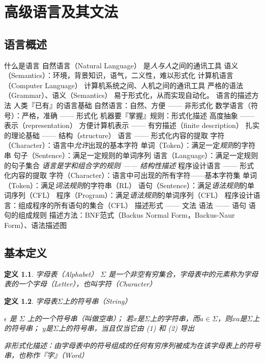 \documentclass[oneside]{ctexbook}
\newtheorem{definition}{定义}[section]
\begin{document}
\chapter{高级语言及其文法}
\section{语言概述}
\begin{outline}
    \1 什么是语言
        \2 自然语言（Natural Language）
            \3 是\emph{人与人}之间的通讯工具
            \3 语义（Semantics）：环境，背景知识，语气，二义性，难以形式化
        \2 计算机语言（Computer Language）
            \3 计算机系统之间、人机之间的通讯工具
            \3 严格的语法（Grammar）、语义（Semantics）
                \4 易于形式化，从而实现自动化。
    \1 语言的描述方法
        \2 人类『已有』的语言基础
            \3 自然语言：自然、方便 —— 非形式化
            \3 数学语言（符号）：严格，准确 —— 形式化
        \2 机器要『掌握』规则：形式化描述
            \3 高度抽象 —— 表示（representation）
            \3 方便计算机表示 —— 有穷描述（finite description）
            \3 扎实的理论基础 —— 结构（structure）
    \1 语言 —— 形式化内容的提取
        \2 字符（Character）：语言中\emph{允许}出现的基本字符
        \2 单词（Token）：满足一定\emph{规则}的字符串
        \2 句子（Sentence）：满足一定规则的单词序列
        \2 语言（Language）：满足一定规则的句子集合
    \1 \emph{语言是字和组合字的规则 —— 结构性描述}
    \1 程序设计语言 —— 形式化内容的提取
        \2 字符（Character）：语言中可出现的所有字符——基本字符集
        \2 单词（Token）：满足\emph{词法规则}的字符串（RL）
        \2 语句（Sentence）：满足\emph{语法规则}的单词序列（CFL）
        \2 程序（Program）：满足\emph{语法规则}的单词序列（CFL）
        \2 程序设计语言：组成程序的所有语句的集合（CFL）
    \1 描述形式 —— 文法
        \2 语法 —— 语句
            \3 语句的组成规则
            \3 描述方法：BNF范式（Backus Normal Form，Backus-Naur Form）、语法描述图
\end{outline}
\section{基本定义}
\begin{definition}
    字母表（Alphabet） $\Sigma$ 是一个非空有穷集合，字母表中的元素称为字母表的一个字母（Letter），也叫字符（Character）
\end{definition}
\begin{definition}
    字母表$\Sigma$上的符号串（String）
    \begin{outline}[enumerate]
        \1 $\epsilon$ 是 $\Sigma$ 上的一个符号串（叫做空串）；
        \1 若$x$是$\Sigma$上的字符串，而$a \in \Sigma$，则$xa$是$\Sigma$上的符号串；
        \1 $y$是$\Sigma$上的符号串，当且仅当它由 (1) 和 (2) 导出
    \end{outline}

    非形式化描述：由字母表中的符号组成的任何有穷序列被成为在该字母表上的符号串，也称作『字』（Word）
\end{definition}
\end{document}
